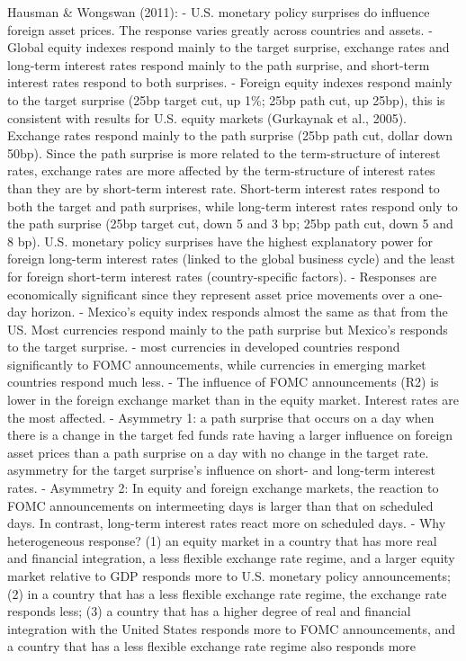 Hausman \& Wongswan (2011):
- U.S. monetary policy surprises do influence foreign asset prices. The response varies greatly across countries and assets.
- Global equity indexes respond mainly to the target surprise, exchange rates and long-term interest rates respond mainly to the path surprise, and short-term interest rates respond to both surprises.
- Foreign equity indexes respond mainly to the target surprise (25bp target cut, up 1\%; 25bp path cut, up 25bp), this is consistent with results for U.S. equity markets (Gurkaynak et al., 2005). Exchange rates respond mainly to the path surprise (25bp path cut, dollar down 50bp). Since the path surprise is more related to the term-structure of interest rates, exchange rates are more affected by the term-structure of interest rates than they are by short-term interest rate. Short-term interest rates respond to both the target and path surprises, while long-term interest rates respond only to the path surprise (25bp target cut, down 5 and 3 bp; 25bp path cut, down 5 and 8 bp). U.S. monetary policy surprises have the highest explanatory power for foreign long-term interest rates (linked to the global business cycle) and the least for foreign short-term interest rates (country-specific factors).
- Responses are economically significant since they represent asset price movements over a one-day horizon.
- Mexico's equity index responds almost the same as that from the US. Most currencies respond mainly to the path surprise but Mexico's responds to the target surprise.
- most currencies in developed countries respond significantly to FOMC announcements, while currencies in emerging market countries respond much less.
- The influence of FOMC announcements (R2) is lower in the foreign exchange market than in the equity market. Interest rates are the most affected.
- Asymmetry 1: a path surprise that occurs on a day when there is a change in the target fed funds rate having a larger influence on foreign asset prices than a path surprise on a day with no change in the target rate. asymmetry for the target surprise’s influence on short- and long-term interest rates.
- Asymmetry 2: In equity and foreign exchange markets, the reaction to FOMC announcements on intermeeting days is larger than that on scheduled days. In contrast, long-term interest rates react more on scheduled days.
- Why heterogeneous response? (1) an equity market in a country that has more real and financial integration, a less flexible exchange rate regime, and a larger equity market relative to GDP responds more to U.S. monetary policy announcements; (2) in a country that has a less flexible exchange rate regime, the exchange rate responds less; (3) a country that has a higher degree of real and financial integration with the United States responds more to FOMC announcements, and a country that has a less flexible exchange rate regime also responds more
